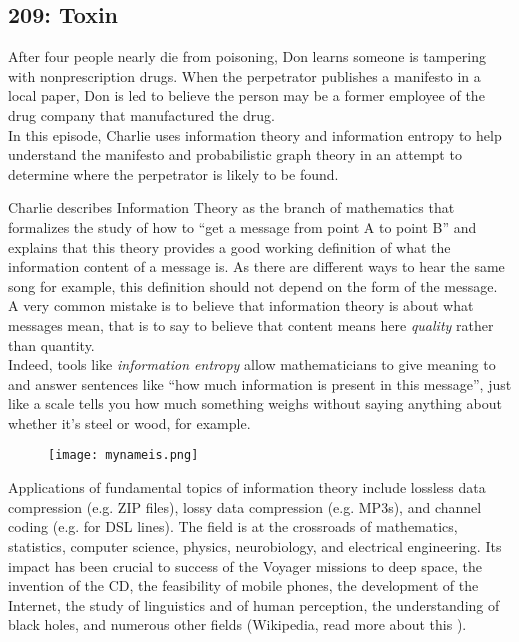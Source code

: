 \newpage
\subsection{209: Toxin}\label{209}

After four people nearly die from poisoning, Don learns someone is tampering with nonprescription drugs. When the perpetrator publishes a manifesto in a local paper, Don is led to believe the person may be a former employee of the drug company that manufactured the drug. \\

In this episode, Charlie uses information theory and information entropy to help understand the manifesto and probabilistic graph theory in an attempt to determine where the perpetrator is likely to be found. \\


Charlie describes Information Theory as the branch of mathematics that formalizes the study of how to ``get a message from point A to point B'' and explains that this theory provides a good working definition of what the information content of a message is. As there are different ways to hear the same song for example, this definition should not depend on the form of the message. \\

A very common mistake is to believe that information theory is about what messages mean, that is to say to believe that content means here \emph{quality} rather than quantity.  \\

Indeed, tools like \emph{information entropy} allow mathematicians to give meaning to and answer sentences like ``how much information is present in this message'', just like a scale tells you how much something weighs without saying anything about whether it's steel or wood, for example. \\

\begin{figure}[H]
   \centering
   \texttt{[image: mynameis.png]} 
\end{figure}

Applications of fundamental topics of information theory include lossless data compression (e.g. ZIP files), lossy data compression (e.g. MP3s), and channel coding (e.g. for DSL lines). The field is at the crossroads of mathematics, statistics, computer science, physics, neurobiology, and electrical engineering. Its impact has been crucial to success of the Voyager missions to deep space, the invention of the CD, the feasibility of mobile phones, the development of the Internet, the study of linguistics and of human perception, the understanding of black holes, and numerous other fields (Wikipedia, read more about this ).

